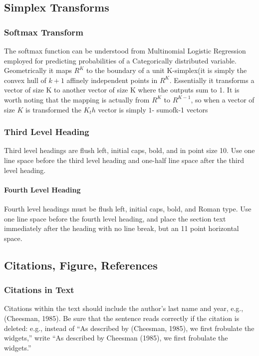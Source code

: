 \documentclass[twoside]{article}
\begin{document}
\subsection{Simplex Transforms}

\subsubsection{Softmax Transform}
The softmax function can be understood from Multinomial Logistic Regression employed for predicting probabilities of a Categorically distributed variable. Geometrically it maps $R^K$ to the boundary of a unit K-simplex(it is simply the convex hull of $k+1$ affinely independent points in $R^K$. Essentially it transforms a vector of size K to another vector of size K where the outputs sum to 1. It is worth noting that the mapping is actually from $R^K$ to $R^{K-1}$, so when a vector of size $K$ is transformed the $K_th$ vector is simply $1$- sumofk-1 vectors


\subsubsection{Third Level Heading}

Third level headings are flush left, initial caps, bold, and in point
size 10. Use one line space before the third level heading and one-half line
space after the third level heading.

\paragraph{Fourth Level Heading}

Fourth level headings must be flush left, initial caps, bold, and
Roman type.  Use one line space before the fourth level heading, and
place the section text immediately after the heading with no line
break, but an 11 point horizontal space.

\subsection{Citations, Figure, References}


\subsubsection{Citations in Text}

Citations within the text should include the author's last name and
year, e.g., (Cheesman, 1985). 
Be sure that the sentence reads
correctly if the citation is deleted: e.g., instead of ``As described
by (Cheesman, 1985), we first frobulate the widgets,'' write ``As
described by Cheesman (1985), we first frobulate the widgets.''
\end{document}
